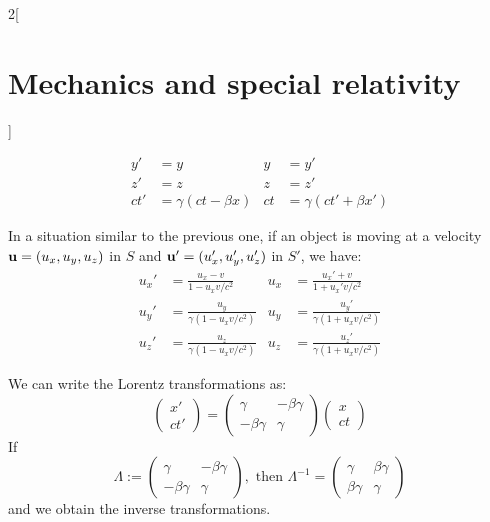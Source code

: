 \documentclass[../../../main.tex]{subfiles}
\begin{document}
\begin{multicols}{2}[\section{Mechanics and special relativity}]
\begin{prop}
\begin{align*}
      y'  & =y                  & y  & =y'                   \\
      z'  & =z                  & z  & =z'                   \\
      ct' & =\gamma(ct-\beta x) & ct & =\gamma(ct'+\beta x')
    \end{align*}
  \end{prop}
  \begin{prop}
    In a situation similar to the previous one, if an object is moving at a velocity $\vb{u}=(u_x,u_y,u_z)$ in $S$ and $\vb{u'}=(u_x',u_y',u_z')$ in $S'$, we have:
    \begin{align*}
      u_x' & =\frac{u_x-v}{1-u_xv/c^2}                   & u_x & =\frac{u_x'+v}{1+u_x'v/c^2}                  \\
      u_y' & =\frac{u_y}{\gamma \left(1-u_xv/c^2\right)} & u_y & =\frac{u_y'}{\gamma \left(1+u_xv/c^2\right)} \\
      u_z' & =\frac{u_z}{\gamma \left(1-u_xv/c^2\right)} & u_z & =\frac{u_z'}{\gamma \left(1+u_xv/c^2\right)}
    \end{align*}
  \end{prop}
  \begin{prop}
    We can write the Lorentz transformations as:
    $$\begin{pmatrix}
        x' \\
        ct'
      \end{pmatrix}=\begin{pmatrix}
        \gamma       & -\beta\gamma \\
        -\beta\gamma & \gamma
      \end{pmatrix}\begin{pmatrix}
        x \\
        ct
      \end{pmatrix}$$ If $$\Lambda:=\begin{pmatrix}
        \gamma       & -\beta\gamma \\
        -\beta\gamma & \gamma
      \end{pmatrix},\text{ then }\Lambda^{-1}=\begin{pmatrix}
        \gamma      & \beta\gamma \\
        \beta\gamma & \gamma
      \end{pmatrix}$$ and we obtain the inverse transformations.
  \end{prop}
  \begin{prop}

\end{prop}
\end{multicols}
\end{document}
